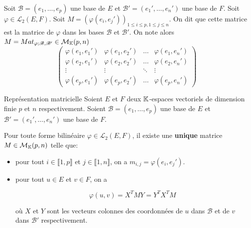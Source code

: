 \documentclass[a4paper, 12pt]{article}
\begin{document}
\begin{definition}
    Soit $\mathscr{B} = (e_1, \dots, e_p)$ une base de $E$ et $\mathscr{B'} = (e_1', \dots, e_n')$ une base de $F$.
    Soit $\varphi \in \mathcal{L}_2(E, F)$. Soit $M = (\varphi(e_i, e_j'))_{1 \leq i \leq p, 1 \leq j \leq n}$.
    On dit que cette matrice est la matrice de $\varphi$ dans les bases $\mathscr{B}$ et $\mathscr{B'}$.
    On note alors $M = Mat_{\varphi; \mathscr{B}, \mathscr{B'}} \in \mathcal{M}_{\mathbb{K}}(p, n)$
    $$
    \begin{pmatrix}
        \varphi(e_1, e_1') & \varphi(e_1, e_2') & \dots & \varphi(e_1, e_n') \\
        \varphi(e_2, e_1') & \varphi(e_2, e_2') & \dots & \varphi(e_2, e_n') \\
        \vdots & \vdots & \ddots & \vdots \\
        \varphi(e_p, e_1') & \varphi(e_p, e_2') & \dots & \varphi(e_p, e_n')
    \end{pmatrix}
    $$
\end{definition}

\begin{theoreme}{Représentation matricielle}{}
    Soient $E$ et $F$ deux $\mathbb{K}$-espaces vectoriels de dimension finie $p$ et $n$ respectivement.
    Soient $\mathscr{B} = (e_1, \dots, e_p)$ une base de $E$ et $\mathscr{B'} = (e_1', \dots, e_n')$ une base de $F$.

    Pour toute forme bilinéaire $\varphi \in \mathcal{L}_2(E, F)$, il existe une \textbf{unique} matrice $M \in \mathcal{M}_{\mathbb{K}}(p, n)$ telle que:
    \begin{itemize}
        \item pour tout $i \in \llbracket 1, p \rrbracket$ et $j \in \llbracket 1, n \rrbracket$, on a $m_{i, j} = \varphi(e_i, e_j')$.
        \item pour tout $u \in E$ et $v \in F$, on a
        
        $$\varphi(u, v) = X^T M Y = Y^T X^T M$$

        où $X$ et $Y$ sont les vecteurs colonnes des coordonnées de $u$ dans $\mathscr{B}$ et de $v$ dans $\mathscr{B'}$ respectivement.
    \end{itemize}
\end{theoreme}
\end{document}
